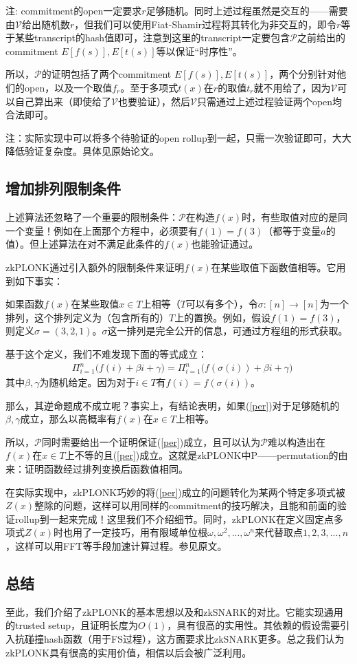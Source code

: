 \documentclass[12pt]{article}
\newcommand{\zk}{zkPLONK}
\newcommand{\pp}{$\mathcal{P}$}
\newcommand{\vv}{$\mathcal{V}$}
\begin{document}
注: commitment的open一定要求$r$足够随机。同时上述过程虽然是交互的——需要由\vv 给出随机数$r$，但我们可以使用Fiat-Shamir过程将其转化为非交互的，即令$r$等于某些transcript的hash值即可，注意到这里的transcript一定要包含\pp 之前给出的commitment $E[f(s)],E[t(s)]$等以保证“时序性”。

所以，\pp 的证明包括了两个commitment $E[f(s)],E[t(s)]$，两个分别针对他们的open，以及一个取值$f_r$。至于多项式$t(x)$在$r$的取值$t_r$就不用给了，因为\vv 可以自己算出来（即使给了\vv 也要验证），然后\vv 只需通过上述过程验证两个open均合法即可。

注：实际实现中可以将多个待验证的open rollup到一起，只需一次验证即可，大大降低验证复杂度。具体见原始论文。
\subsection{增加排列限制条件}
上述算法还忽略了一个重要的限制条件：\pp 在构造$f(x)$时，有些取值对应的是同一个变量！例如在上面那个方程中，必须要有$f(1)=f(3)$（都等于变量$a$的值）。但上述算法在对不满足此条件的$f(x)$也能验证通过。

\zk 通过引入额外的限制条件来证明$f(x)$在某些取值下函数值相等。它用到如下事实：

如果函数$f(x)$在某些取值$x \in T$上相等（$T$可以有多个），令$\sigma: [n] \rightarrow [n]$为一个排列，这个排列定义为（包含所有的）$T$上的置换。例如，假设$f(1)=f(3)$，则定义$\sigma=(3,2,1)$。$\sigma$这一排列是完全公开的信息，可通过方程组的形式获取。

基于这个定义，我们不难发现下面的等式成立：
\begin{align}
	\label{per}
& \Pi_{i=1}^n \big( f(i)+\beta i +\gamma \big) = \Pi_{i=1}^n \big( f(\sigma(i))+\beta i +\gamma \big)
\end{align}
其中$\beta,\gamma$为随机给定。因为对于$i \in T$有$f(i)=f(\sigma(i))$。

那么，其逆命题成不成立呢？事实上，有结论表明，如果(\ref{per})对于足够随机的$\beta,\gamma$成立，那么以高概率有$f(x)$在$x \in T$上相等。

所以，\pp 同时需要给出一个证明保证(\ref{per})成立，且可以认为\pp 难以构造出在$f(x)$在$x \in T$上不等的且(\ref{per})成立。这就是\zk 中P——permutation的由来：证明函数经过排列变换后函数值相同。

在实际实现中，\zk 巧妙的将(\ref{per})成立的问题转化为某两个特定多项式被$Z(x)$整除的问题，这样可以用同样的commitment的技巧解决，且能和前面的验证rollup到一起来完成！这里我们不介绍细节。同时，\zk 在定义固定点多项式$Z(x)$时也用了一定技巧，用有限域单位根$\omega,\omega^2,...,\omega^n$来代替取点$1,2,3,...,n$，这样可以用FFT等手段加速计算过程。参见原文。
\subsection{总结}
至此，我们介绍了\zk 的基本思想以及和zkSNARK的对比。它能实现通用的trusted setup，且证明长度为$O(1)$，具有很高的实用性。其依赖的假设需要引入抗碰撞hash函数（用于FS过程），这方面要求比zkSNARK更多。总之我们认为\zk 具有很高的实用价值，相信以后会被广泛利用。



\newpage
\begin{appendices}
%
\end{appendices}
\end{document}
